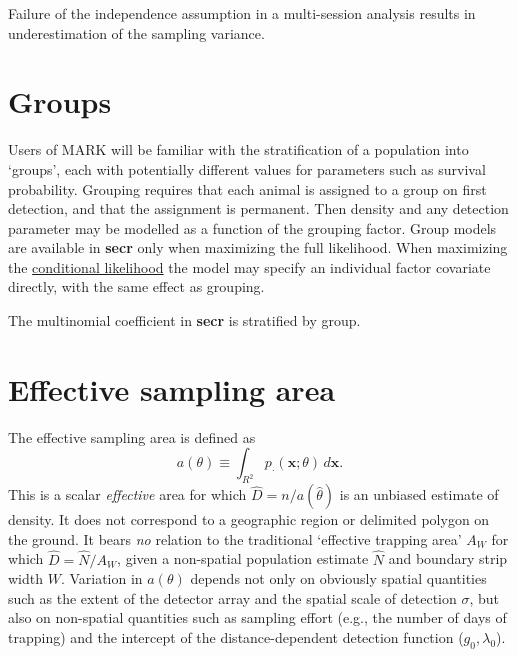 \documentclass[
]{book}
\begin{document}
Failure of the independence assumption in a multi-session analysis results in underestimation of the sampling variance.

\section{Groups}\label{groups}


Users of MARK \citep{cw} will be familiar with the stratification of a population into `groups', each with potentially different values for parameters such as survival probability. Grouping requires that each animal is assigned to a group on first detection, and that the assignment is permanent. Then density and any detection parameter may be modelled as a function of the grouping factor. Group models are available in \textbf{secr} only when maximizing the full likelihood. When maximizing the \hyperref[conditional]{conditional likelihood} the model may specify an individual factor covariate directly, with the same effect as grouping.

The multinomial coefficient in \textbf{secr} is stratified by group.

\section{Effective sampling area}\label{esa}


The effective sampling area is defined \citep{be08} as
\begin{equation}
a(\theta) \equiv \int_{R^2} p_\cdot(\mathbf{x}; \theta) \, d\mathbf{x}. 
\label{eq:esa}
\end{equation}
This is a scalar \emph{effective} area for which \(\hat D = n / a(\hat \theta)\) is an unbiased estimate of density. It does not correspond to a geographic region or delimited polygon on the ground. It bears \emph{no} relation to the traditional `effective trapping area' \(A_W\) \citep[e.g.,][]{obwa78} for which \(\hat D = \hat N / A_W\), given a non-spatial population estimate \(\hat N\) and boundary strip width \(W\). Variation in \(a(\theta)\) depends not only on obviously spatial quantities such as the extent of the detector array and the spatial scale of detection \(\sigma\), but also on non-spatial quantities such as sampling effort (e.g., the number of days of trapping) and the intercept of the distance-dependent detection function (\(g_0, \lambda_0\)).
\end{document}
